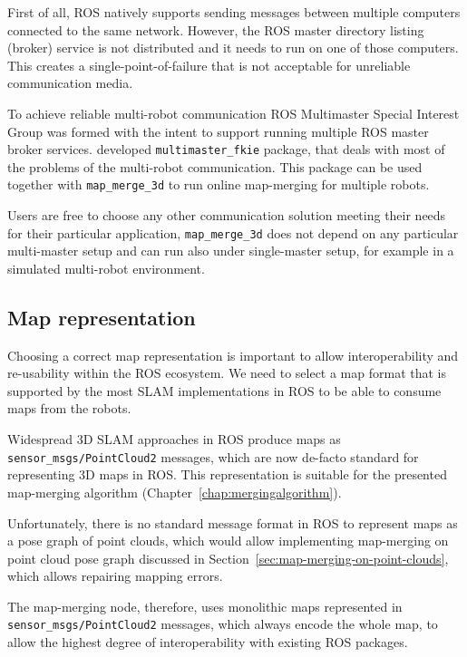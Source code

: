 First of all, \gls{ROS} natively supports sending messages between multiple computers connected to the same network. However, the \gls{ROS} master directory listing (broker) service is not distributed and it needs to run on one of those computers. This creates a single-point-of-failure that is not acceptable for unreliable communication media.

To achieve reliable multi-robot communication \gls{ROS} Multimaster Special Interest Group was formed with the intent to support running multiple \gls{ROS} master broker services. \citet{hernadez2015multi} developed \texttt{multimaster\_fkie} package, that deals with most of the problems of the multi-robot communication. This package can be used together with \texttt{map\_merge\_3d} to run online map-merging for multiple robots.

Users are free to choose any other communication solution meeting their needs for their particular application, \texttt{map\_merge\_3d} does not depend on any particular multi-master setup and can run also under single-master setup, for example in a simulated multi-robot environment.

\subsection{Map representation}
\label{sec:map-representation}

Choosing a correct map representation is important to allow interoperability and re-usability within the \gls{ROS} ecosystem. We need to select a map format that is supported by the most \gls{SLAM} implementations in \gls{ROS} to be able to consume maps from the robots.

Widespread \gls{3D} \gls{SLAM} approaches in \gls{ROS} produce maps as \texttt{sen\-sor\_msgs/\-Point\-Cloud2} messages, which are now de-facto standard for representing \gls{3D} maps in \gls{ROS}. This representation is suitable for the presented map-merging algorithm (Chapter~\ref{chap:mergingalgorithm}).

Unfortunately, there is no standard message format in \gls{ROS} to represent maps as a pose graph of point clouds, which would allow implementing map-merging on point cloud pose graph discussed in Section~\ref{sec:map-merging-on-point-clouds}, which allows repairing mapping errors.

The map-merging node, therefore, uses monolithic maps represented in \texttt{sen\-sor\_msgs/\-Point\-Cloud2} messages, which always encode the whole map, to allow the highest degree of interoperability with existing \gls{ROS} packages.

